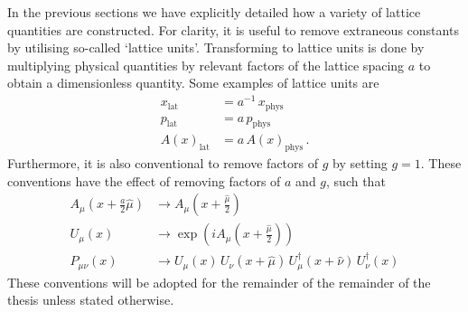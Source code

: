 In the previous sections we have explicitly detailed how a variety of lattice quantities are constructed. For clarity, it is useful to remove extraneous constants by utilising so-called `lattice units'. Transforming to lattice units is done by multiplying physical quantities by relevant factors of the lattice spacing $a$ to obtain a dimensionless quantity. Some examples of lattice units are
%
\begin{align*}
x_\text{lat} &= a^{-1}\,x_\text{phys}\\
p_\text{lat} &= a\, p_\text{phys}\\
A(x)_\text{lat} &= a\, A(x)_\text{phys}\, .
\end{align*}
%
Furthermore, it is also conventional to remove factors of $g$ by setting $g=1$. These conventions have the effect of removing factors of $a$ and $g$, such that
%
\begin{align*}
A_\mu \left( x+\frac{a}{2}\hat{\mu} \right)&\rightarrow A_\mu \left(x+\frac{\hat{\mu}}{2} \right)\\
U_\mu(x) &\rightarrow \exp\left( i A_\mu \left(x+\frac{\hat{\mu}}{2}\right)\right)\\
P_{\mu\nu}(x) &\rightarrow U_\mu(x)\,U_\nu(x+\hat{\mu})\, U_\mu^\dag(x+\hat{\nu})\, U_\nu^\dag(x)
\end{align*}
%
These conventions will be adopted for the remainder of the remainder of the thesis unless stated otherwise. 

%
%
%
%
%

